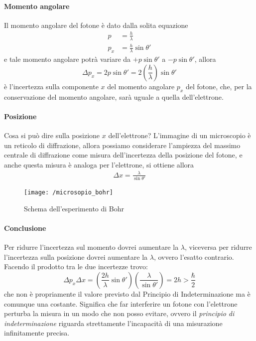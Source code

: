 \paragraph{Momento angolare} Il momento angolare del fotone è dato dalla solita equazione
\begin{equation}
\begin{split}
p & = \frac{h}{\lambda} \\
p_x & = \frac{h}{\lambda} \sin\theta'
\end{split}
\end{equation}
e tale momento angolare potrà variare da $+p \sin \theta '$ a $-p \sin \theta '$, allora
\begin{equation}
\Delta p_x = 2p \sin \theta ' = 2(\frac{h }{\lambda }) \sin \theta '
\end{equation}
è l'incertezza sulla componente $x$ del momento angolare $p_x$ del fotone, che, per la conservazione del momento angolare, sarà uguale a quella dell'elettrone.

\paragraph{Posizione} Cosa si può dire sulla posizione $x$ dell'elettrone?
L'immagine di un microscopio è un reticolo di diffrazione, allora possiamo considerare l'ampiezza del massimo centrale di diffrazione come misura dell'incertezza della posizione del fotone, e anche questa misura è analoga per l'elettrone, si ottiene allora
\begin{equation}
\begin{split}
\Delta x = \frac{\lambda}{\sin \theta '}
\end{split}
\end{equation}

\begin{figure}[h]
\centering
\texttt{[image: /microsopio\_bohr]}
\caption{Schema dell'esperimento di Bohr}
\label{esp_bohr}
\end{figure}

\paragraph{Conclusione} Per ridurre l'incertezza sul momento dovrei aumentare la $\lambda$, viceversa per ridurre l'incertezza sulla posizione dovrei aumentare la $\lambda$, ovvero l'esatto contrario.
Facendo il prodotto tra le due incertezze trovo:
\begin{equation}
\Delta p_x \Delta x = (\frac{2h}{\lambda} \sin \theta ')(\frac{\lambda}{\sin \theta '}) = 2h > \frac{\hbar}{2}
\end{equation}
che non è propriamente il valore previsto dal Principio di Indeterminazione ma è comunque una costante.
Significa che far interferire un fotone con l'elettrone perturba la misura in un modo che non posso evitare, ovvero il \textit{principio di indeterminazione} riguarda strettamente l'incapacità di una misurazione infinitamente precisa.

